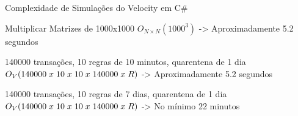 \documentclass[10pt]{beamer}
\begin{document}
\begin{frame}[fragile]{Complexidade de Simulações do Velocity em C\#}	
	\begin{block}{Multiplicar Matrizes de 1000x1000}
		\textcolor{purplevs}{$O_{N \times N}(1000^3)$} -> \textcolor{purplevs}{Aproximadamente 5.2 segundos}
	\end{block}	
	
	\vspace{0.5cm}
	
	\begin{block}{140000 transações, 10 regras de 10 minutos, quarentena de 1 dia}
		\textcolor{bluevs}{$O_V(140000\hspace{0.1cm}x\hspace{0.1cm}10\hspace{0.1cm}x\hspace{0.1cm}10\hspace{0.1cm}x\hspace{0.1cm}140000\hspace{0.1cm}x\hspace{0.1cm}R)$} -> \textcolor{bluevs}{Aproximadamente 5.2 segundos}
	\end{block}	
	
	
	\vspace{0.5cm}
	
	\begin{block}{140000 transações, 10 regras de 7 dias, quarentena de 1 dia}
		\textcolor{bluevs}{$O_V(140000\hspace{0.1cm}x\hspace{0.1cm}10\hspace{0.1cm}x\hspace{0.1cm}10\hspace{0.1cm}x\hspace{0.1cm}140000\hspace{0.1cm}x\hspace{0.1cm}R)$} -> \textcolor{bluevs}{No mínimo 22 minutos}
	\end{block}		
\end{frame}
\end{document}
